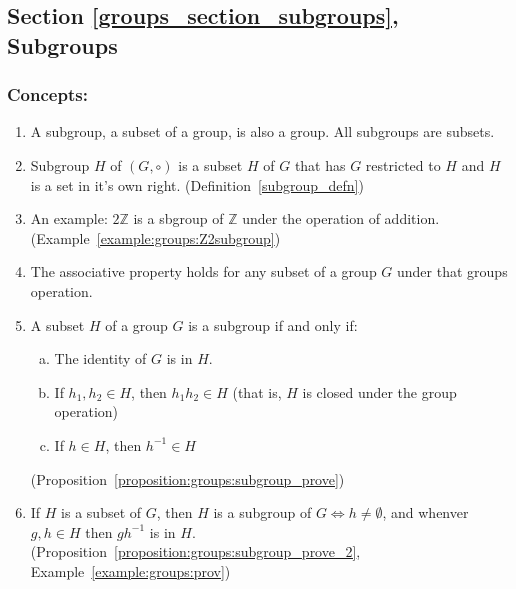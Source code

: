 \subsection*{Section \ref{groups_section_subgroups}, Subgroups}
\subsubsection*{Concepts:}
\begin{enumerate}
\item 
A subgroup, a subset of a group, is also a group. All subgroups are subsets.
	
\item
Subgroup $H$ of $(G, \circ)$ is a subset $H$ of $G$ that has $G$ restricted to $H$ and $H$ is a set in it's own right. (Definition~\ref{subgroup_defn})

\item
An example: $2{\mathbb Z}$ is a sbgroup of ${\mathbb Z}$ under the operation of addition.  (Example~\ref{example:groups:Z2subgroup})

\item
The associative property holds for any subset of a group $G$ under that groups operation.

\item
A subset $H$ of a group $G$ is a subgroup if and only if:
	\begin{enumerate}[(a)]
	\item
	The identity of $G$ is in $H$.

	\item
	If $h_1, h_2 \in H$, then $h_1h_2 \in H$ (that is, $H$ is closed under the group operation)

	\item
	If $h \in H$, then $h^{-1} \in H$
	\end{enumerate}
(Proposition~\ref{proposition:groups:subgroup_prove})

\item
If $H$ is a subset of $G$, then $H$ is a subgroup of $G \iff h \neq \emptyset$, and whenver $g, h \in H$ then $gh^{-1}$ is in $H$. (Proposition~\ref{proposition:groups:subgroup_prove_2}, Example~\ref{example:groups:prov})
\end{enumerate}

